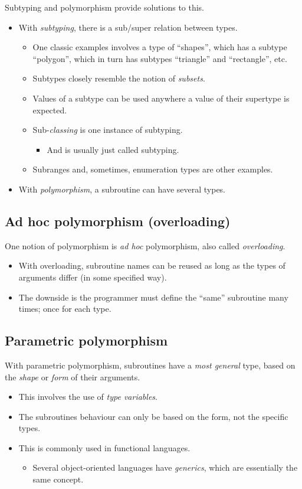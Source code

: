 \documentclass[11pt]{article}
\theoremstyle{definition}
\begin{document}
Subtyping and polymorphism provide solutions to this.
\begin{itemize}
\item With \emph{subtyping}, there is a sub/super relation between types.
\begin{itemize}
\item One classic examples involves a type of “shapes”, which has
a subtype “polygon”, which in turn has subtypes “triangle”
and “rectangle”, etc.
\item Subtypes closely resemble the notion of \emph{subsets}.
\item Values of a subtype can be used anywhere
a value of their supertype is expected.
\item Sub-\emph{classing} is one instance of subtyping.
\begin{itemize}
\item And is usually just called subtyping.
\end{itemize}
\item Subranges and, sometimes, enumeration types are other examples.
\end{itemize}
\item With \emph{polymorphism}, a subroutine can have several types.
\end{itemize}

\subsection{Ad hoc polymorphism (overloading)}
\label{sec:orga68b2b6}

One notion of polymorphism is \emph{ad hoc} polymorphism,
also called \emph{overloading}.
\begin{itemize}
\item With overloading, subroutine names
can be reused as long as the types of arguments
differ (in some specified way).
\item The downside is the programmer must define
the “same” subroutine many times; once for each type.
\end{itemize}

\subsection{Parametric polymorphism}
\label{sec:orgc0b9d04}

With parametric polymorphism, subroutines have a
\emph{most general} type, based on the \emph{shape} or \emph{form} of their arguments.
\begin{itemize}
\item This involves the use of \emph{type variables}.
\item The subroutines behaviour can only be based on the form,
not the specific types.
\item This is commonly used in functional languages.
\begin{itemize}
\item Several object-oriented languages have \emph{generics}, which are
essentially the same concept.
\end{itemize}
\end{itemize}
\end{document}
